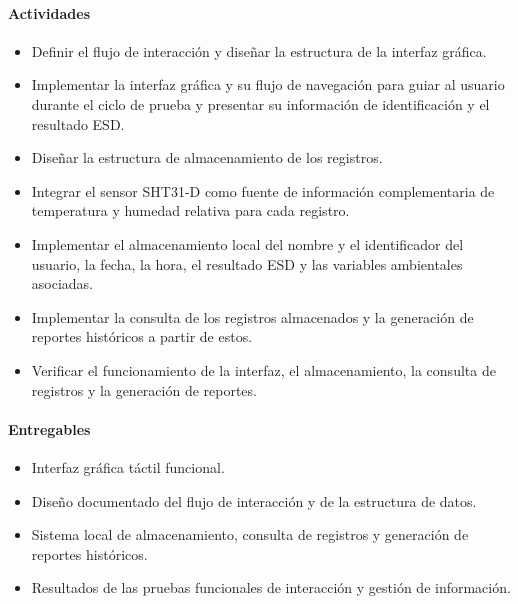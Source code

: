 \paragraph{Actividades}

\begin{itemize}

\item Definir el flujo de interacción y diseñar la estructura de la interfaz
gráfica.

\item Implementar la interfaz gráfica y su flujo de navegación para guiar al
usuario durante el ciclo de prueba y presentar su información de identificación
y el resultado ESD.

\item Diseñar la estructura de almacenamiento de los registros.

\item Integrar el sensor SHT31-D como fuente de información complementaria de
temperatura y humedad relativa para cada registro.

\item Implementar el almacenamiento local del nombre y el identificador del
usuario, la fecha, la hora, el resultado ESD y las variables ambientales asociadas.

\item Implementar la consulta de los registros almacenados y la generación de
reportes históricos a partir de estos.

\item Verificar el funcionamiento de la interfaz, el almacenamiento, la consulta
de registros y la generación de reportes.

\end{itemize}

\paragraph{Entregables}

\begin{itemize}

\item Interfaz gráfica táctil funcional.

\item Diseño documentado del flujo de interacción y de la estructura de datos.

\item Sistema local de almacenamiento, consulta de registros y generación de
reportes históricos.

\item Resultados de las pruebas funcionales de interacción y gestión de
información.

\end{itemize}

